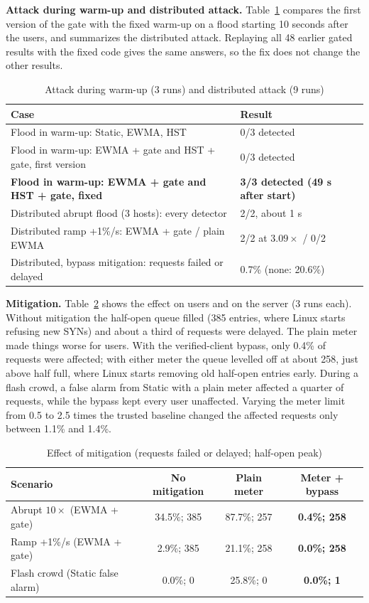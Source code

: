 \documentclass[12pt,a4paper,oneside]{report}
\begin{document}
\textbf{Attack during warm-up and distributed attack.} Table~\ref{tab:early} compares the first version of the gate with the fixed warm-up on a flood starting 10 seconds after the users, and summarizes the distributed attack. Replaying all 48 earlier gated results with the fixed code gives the same answers, so the fix does not change the other results.
\begin{table}[htbp]\centering\caption{Attack during warm-up (3 runs) and distributed attack (9 runs)}\label{tab:early}\begin{tabularx}{\textwidth}{Xl}\toprule Case & Result\\\midrule
Flood in warm-up: Static, EWMA, HST & 0/3 detected\\
Flood in warm-up: EWMA + gate and HST + gate, first version & 0/3 detected\\
\textbf{Flood in warm-up: EWMA + gate and HST + gate, fixed} & \textbf{3/3 detected (49 s after start)}\\
Distributed abrupt flood (3 hosts): every detector & 2/2, about 1 s\\
Distributed ramp +1\%/s: EWMA + gate / plain EWMA & 2/2 at $3.09\times$ / 0/2\\
Distributed, bypass mitigation: requests failed or delayed & 0.7\% (none: 20.6\%)\\
\bottomrule\end{tabularx}\end{table}

\textbf{Mitigation.} Table~\ref{tab:mitigation} shows the effect on users and on the server (3 runs each). Without mitigation the half-open queue filled (385 entries, where Linux starts refusing new SYNs) and about a third of requests were delayed. The plain meter made things worse for users. With the verified-client bypass, only 0.4\% of requests were affected; with either meter the queue levelled off at about 258, just above half full, where Linux starts removing old half-open entries early. During a flash crowd, a false alarm from Static with a plain meter affected a quarter of requests, while the bypass kept every user unaffected. Varying the meter limit from 0.5 to 2.5 times the trusted baseline changed the affected requests only between 1.1\% and 1.4\%.
\begin{table}[htbp]\centering\caption{Effect of mitigation (requests failed or delayed; half-open peak)}\label{tab:mitigation}\begin{tabular}{lccc}\toprule Scenario & No mitigation & Plain meter & Meter + bypass\\\midrule
Abrupt $10\times$ (EWMA + gate) & 34.5\%; 385 & 87.7\%; 257 & \textbf{0.4\%; 258}\\
Ramp +1\%/s (EWMA + gate) & 2.9\%; 385 & 21.1\%; 258 & \textbf{0.0\%; 258}\\
Flash crowd (Static false alarm) & 0.0\%; 0 & 25.8\%; 0 & \textbf{0.0\%; 1}\\\bottomrule\end{tabular}\end{table}
\end{document}
